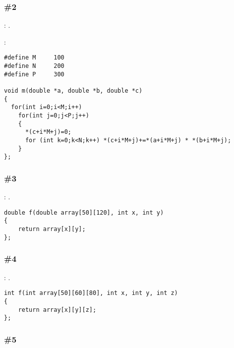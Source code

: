 \subsubsection{\Exercise \#2}
\label{exercise_solutions_arrays_2}

\Exercise: .


:

\begin{lstlisting}
#define M     100
#define N     200
#define P     300

void m(double *a, double *b, double *c)
{
  for(int i=0;i<M;i++)
    for(int j=0;j<P;j++)
    {
      *(c+i*M+j)=0;
      for (int k=0;k<N;k++) *(c+i*M+j)+=*(a+i*M+j) * *(b+i*M+j);
    }
};
\end{lstlisting}

\subsubsection{\Exercise \#3}
\label{exercise_solutions_arrays_3}

\Exercise: .

\begin{lstlisting}
double f(double array[50][120], int x, int y)
{
	return array[x][y];
};
\end{lstlisting}

\subsubsection{\Exercise \#4}
\label{exercise_solutions_arrays_4}

\Exercise: .

\begin{lstlisting}
int f(int array[50][60][80], int x, int y, int z)
{
	return array[x][y][z];
};
\end{lstlisting}

\subsubsection{\Exercise \#5}
\label{exercise_solutions_arrays_5}

